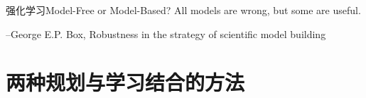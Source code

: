 \documentclass[10pt]{beamer}
\begin{document}
	\begin{frame}{强化学习}{Model-Free or Model-Based?}
		All models are wrong, but some are useful.
		\begin{flushright}
			--George E.P. Box, Robustness in the strategy of scientific model building
		\end{flushright}
	
		\begin{figure}
			\centering
		\end{figure}
	\end{frame}

	\section{两种规划与学习结合的方法}
	
\end{document}
